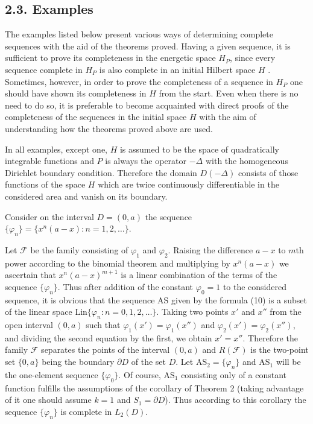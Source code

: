 \documentclass{article}
\newcommand{\tmrsub}[1]{\ensuremath{_{\textrm{#1}}}}
\begin{document}
\subsection*{2.3. Examples}

The examples listed below present various ways of determining complete
sequences with the aid of the theorems proved. Having a given sequence, it is
sufficient to prove its completeness in the energetic space $H_P$, since every
sequence complete in $H_P$ is also complete in an initial Hilbert space $H$
{\cite{15}}. Sometimes, however, in order to prove the completeness of a
sequence in $H_P$ one should have shown its completeness in $H$ from the
start. Even when there is no need to do so, it is preferable to become
acquainted with direct proofs of the completeness of the sequences in the
initial space $H$ with the aim of understanding how the theorems proved above
are used.

In all examples, except one, $H$ is assumed to be the space of quadratically
integrable functions and $P$ is always the operator $- \Delta$ with the
homogeneous Dirichlet boundary condition. Therefore the domain $D (- \Delta)$
consists of those functions of the space $H$ which are twice continuously
differentiable in the considered area and vanish on its boundary.

\begin{example}
  Consider on the interval $D = (0, a)$ the sequence $\{\varphi_n \} = \{x^n
  (a - x) : n = 1, 2, \ldots\}$.
  
  Let $\mathcal{F}$ be the family consisting of $\varphi_1$ and $\varphi_2$.
  Raising the difference $a - x$ to $m$th power according to the binomial
  theorem and multiplying by $x^n  (a - x)$ we ascertain that $x^n  (a - x)^{m
  + 1}$ is a linear combination of the terms of the sequence $\{\varphi_n \}$.
  Thus after addition of the constant $\varphi_0 = 1$ to the considered
  sequence, it is obvious that the sequence AS given by the formula (10) is a
  subset of the linear space Lin$\{\varphi_n : n = 0, 1, 2, \ldots\}$. Taking
  two points $x'$ and $x''$ from the open interval $(0, a)$ such that
  $\varphi_1 (x') = \varphi_1 (x'')$ and $\varphi_2 (x') = \varphi_2 (x'')$,
  and dividing the second equation by the first, we obtain $x' = x''$.
  Therefore the family $\mathcal{F}$ separates the points of the interval $(0,
  a)$ and $R (\mathcal{F})$ is the two-point set $\{0, a\}$ being the boundary
  $\partial D$ of the set $D$. Let AS$_2 = \{\varphi_n \}$ and AS\tmrsub{$1$}
  will be the one-element sequence $\{\varphi_0 \}$. Of course, AS\tmrsub{$1$}
  consisting only of a constant function fulfills the assumptions of the
  corollary of Theorem 2 (taking advantage of it one should assume $k = 1$ and
  $S_1 = \partial D$). Thus according to this corollary the sequence
  $\{\varphi_n \}$ is complete in $L_2 (D)$.
\end{example}
\end{document}
